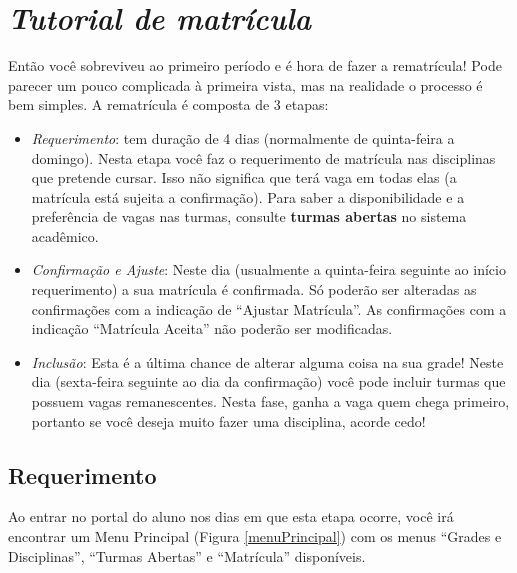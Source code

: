 \documentclass[a4paper,12pt,openany]{article}
\begin{document}
\newpage
\section{\textit{Tutorial de matrícula}}

Então você sobreviveu ao primeiro período e é hora de fazer a rematrícula! Pode parecer um pouco complicada à primeira vista, mas na realidade o processo é bem simples. A rematrícula é composta de 3 etapas:

\begin{itemize}
\item \textit{Requerimento}: tem duração de 4 dias (normalmente de quinta-feira a domingo). Nesta etapa você faz o requerimento de matrícula nas disciplinas que pretende cursar. Isso não significa que terá vaga em todas elas (a matrícula está sujeita a confirmação). Para saber a disponibilidade e a preferência de vagas nas turmas, consulte \textbf{turmas abertas} no sistema acadêmico.

\item \textit {Confirmação e Ajuste}: Neste dia (usualmente a quinta-feira seguinte ao início requerimento) a sua matrícula é confirmada. Só poderão ser alteradas as confirmações com a indicação de ``Ajustar Matrícula''. As confirmações com a indicação ``Matrícula Aceita'' não poderão ser modificadas.

\item \textit{Inclusão}: Esta é a última chance de alterar alguma coisa na sua grade! Neste dia (sexta-feira seguinte ao dia da confirmação) você pode incluir turmas que possuem vagas remanescentes. Nesta fase, ganha a vaga quem chega primeiro, portanto se você deseja muito fazer uma disciplina, acorde cedo!

\end{itemize}

\subsection{Requerimento}

Ao entrar no portal do aluno nos dias em que esta etapa ocorre, você irá encontrar um Menu Principal (Figura \ref{menuPrincipal}) com os menus ``Grades e Disciplinas'', ``Turmas Abertas'' e ``Matrícula'' disponíveis.
\end{document}
